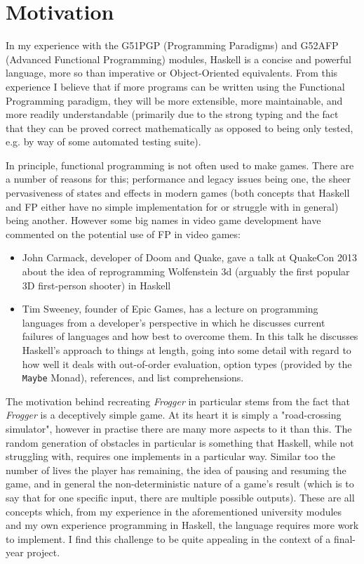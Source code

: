 \documentclass[12pt, a4paper]{report}
\begin{document}
\section{Motivation}
In my experience with the G51PGP (Programming Paradigms) and G52AFP (Advanced Functional Programming) modules, Haskell is a concise and powerful language, more so than imperative or Object-Oriented equivalents.
From this experience I believe that if more programs can be written using the Functional Programming paradigm, they will be more extensible, more maintainable, and more readily understandable (primarily due to the strong typing and the fact that they can be proved correct mathematically as opposed to being only tested, e.g. by way of some automated testing suite).
\par
In principle, functional programming is not often used to make games.
There are a number of reasons for this; performance and legacy issues being one, the sheer pervasiveness of states and effects in modern games (both concepts that Haskell and FP either have no simple implementation for or struggle with in general) being another.
However some big names in video game development have commented on the potential use of FP in video games:
\begin{itemize}
  \item John Carmack, developer of Doom and Quake, gave a talk at QuakeCon 2013 about the idea of reprogramming Wolfenstein 3d (arguably the first popular 3D first-person shooter) in Haskell\cite{carmackspeech}
  \item Tim Sweeney, founder of Epic Games, has a lecture on programming languages from a developer's perspective in which he discusses current failures of languages and how best to overcome them.
    In this talk he discusses Haskell's approach to things at length, going into some detail with regard to how well it deals with out-of-order evaluation, option types (provided by the \verb|Maybe| Monad), references, and list comprehensions\cite{sweeneytalk}.
\end{itemize}
\par
The motivation behind recreating \textit{Frogger} in particular stems from the fact that \textit{Frogger} is a deceptively simple game.
At its heart it is simply a "road-crossing simulator", however in practise there are many more aspects to it than this.
The random generation of obstacles in particular is something that Haskell, while not struggling with, requires one implements in a particular way.
Similar too the number of lives the player has remaining, the idea of pausing and resuming the game, and in general the non-deterministic nature of a game's result (which is to say that for one specific input, there are multiple possible outputs).
These are all concepts which, from my experience in the aforementioned university modules and my own experience programming in Haskell, the language requires more work to implement.
I find this challenge to be quite appealing in the context of a final-year project.
\end{document}
